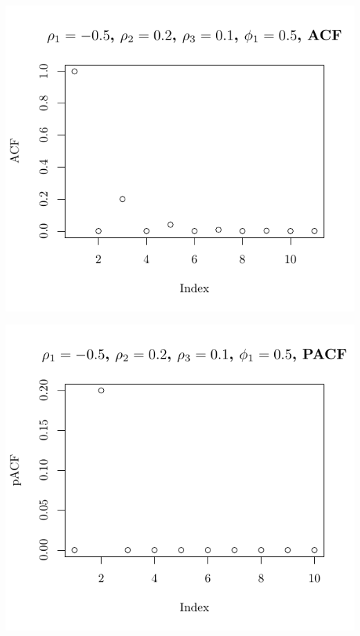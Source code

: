 \documentclass[10pt]{paper}\usepackage[]{graphicx}\usepackage[]{color}
\makeatletter
\def\maxwidth{ %
  \ifdim\Gin@nat@width>\linewidth
    \linewidth
  \else
    \Gin@nat@width
  \fi
}
\newenvironment{knitrout}{}{} %
\makeatother
\begin{document}
\begin{knitrout}
{\centering \includegraphics[width=\maxwidth]{figure/graphics-plotter-127} 

}




{\centering \includegraphics[width=\maxwidth]{figure/graphics-plotter-128} 

}





\end{knitrout}
\end{document}
